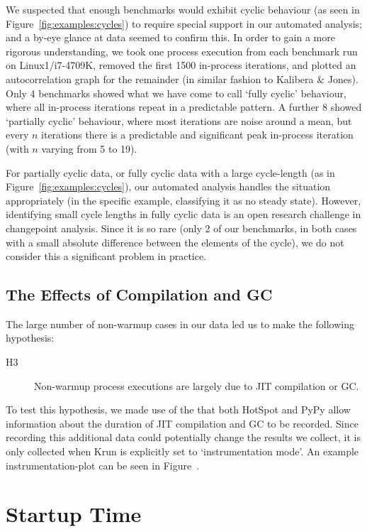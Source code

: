 \documentclass[preprint,numbers,10pt]{sigplanconf}
\newcommand{\kalibera}{Kalibera \& Jones\xspace}
\newcommand{\krun}{Krun\xspace}
\newcommand{\bencherthree}{Linux1/i7-4709K\xspace}
\begin{document}
We suspected that enough benchmarks
would exhibit cyclic behaviour (as seen in Figure~\ref{fig:examples:cycles}) to
require special support in our automated analysis; and a by-eye glance at
data seemed to confirm this. In order to gain a more rigorous
understanding, we took one process
execution from each benchmark run on \bencherthree, removed the first 1500
in-process iterations, and plotted an autocorrelation graph for the remainder
(in similar fashion to \kalibera). Only 4 benchmarks showed what we have come to
call `fully cyclic' behaviour, where all in-process iterations repeat in a
predictable pattern. A further 8 showed `partially cyclic' behaviour, where
most iterations are noise around a mean, but every $n$ iterations there is a
predictable and significant peak in-process iteration (with $n$ varying from 5
to 19).

For partially cyclic data, or fully cyclic data with a large cycle-length (as in
Figure~\ref{fig:examples:cycles}), our automated analysis handles the situation
appropriately (in the specific example, classifying it as no steady state).
However, identifying small cycle lengths in fully cyclic data is
an open research challenge in changepoint analysis. Since it is so rare (only 2
of our benchmarks, in both cases with a small absolute difference between the
elements of the cycle), we do not consider this a significant problem in practice.


\subsection{The Effects of Compilation and GC}
\label{sec:deepdive}

The large number of non-warmup cases in our data led us to make the following hypothesis:
\begin{description}
  \item[H3] Non-warmup process executions are largely due to JIT compilation or GC.
\end{description}
To test this hypothesis, we made use of the that both HotSpot and PyPy allow
information about the duration of JIT compilation and GC to be recorded. Since
recording this additional data could potentially change the results we collect,
it is only collected when \krun is explicitly set to `instrumentation mode'. An
example instrumentation-plot can be seen in Figure~.



\section{Startup Time}
\label{sec:startup}
\end{document}

